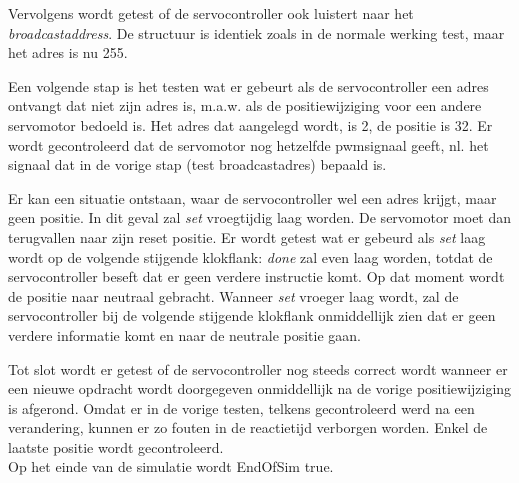 
Vervolgens wordt getest of de servocontroller ook luistert naar het \textit{broadcastaddress}. De structuur is identiek zoals in de normale werking test, maar het adres is nu 255.


Een volgende stap is het testen wat er gebeurt als de servocontroller een adres ontvangt dat niet zijn adres is, m.a.w. als de positiewijziging voor een andere servomotor bedoeld is. Het adres dat aangelegd wordt, is 2, de positie is 32\textdegree. Er wordt gecontroleerd dat de servomotor nog hetzelfde \gls{pwm}signaal geeft, nl. het signaal dat in de vorige stap (test broadcastadres) bepaald is.


Er kan een situatie ontstaan, waar de servocontroller wel een adres krijgt, maar geen positie. In dit geval zal \textit{set} vroegtijdig laag worden. De servomotor moet dan terugvallen naar zijn reset positie. Er wordt getest wat er gebeurd als \textit{set} laag wordt op de volgende stijgende klokflank: \textit{done} zal even laag worden, totdat de servocontroller beseft dat er geen verdere instructie komt. Op dat moment wordt de positie naar neutraal gebracht. Wanneer \textit{set} vroeger laag wordt, zal de servocontroller bij de volgende stijgende klokflank onmiddellijk zien dat er geen verdere informatie komt en naar de neutrale positie gaan.


Tot slot wordt er getest of de servocontroller nog steeds correct wordt wanneer er een nieuwe opdracht wordt doorgegeven onmiddellijk na de vorige positiewijziging is afgerond. Omdat er in de vorige testen, telkens gecontroleerd werd na een verandering, kunnen er zo fouten in de reactietijd verborgen worden. Enkel de laatste positie wordt gecontroleerd.\\
\noindent
Op het einde van de simulatie wordt EndOfSim true.


